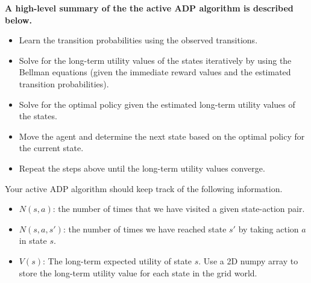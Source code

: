 \documentclass[12pt]{article}
\begin{document}
{\bf A high-level summary of the the active ADP algorithm is described below.}
\begin{itemize}
\item Learn the transition probabilities using the observed transitions.

\item Solve for the long-term utility values of the states iteratively by using the Bellman equations (given the immediate reward values and the estimated transition probabilities).

\item Solve for the optimal policy given the estimated long-term utility values of the states.

\item Move the agent and determine the next state based on the optimal policy for the current state.

\item Repeat the steps above until the long-term utility values converge.
\end{itemize}

Your active ADP algorithm should keep track of the following information. 
\begin{itemize}

\item $N(s,a)$: the number of times that we have visited a given state-action pair.

\item $N(s,a,s')$: the number of times we have reached state $s'$ by taking action $a$ in state $s$.

\item $V(s)$: The long-term expected utility of state $s$. Use a 2D numpy array to store the long-term utility value for each state in the grid world.


\end{itemize}
\end{document}
